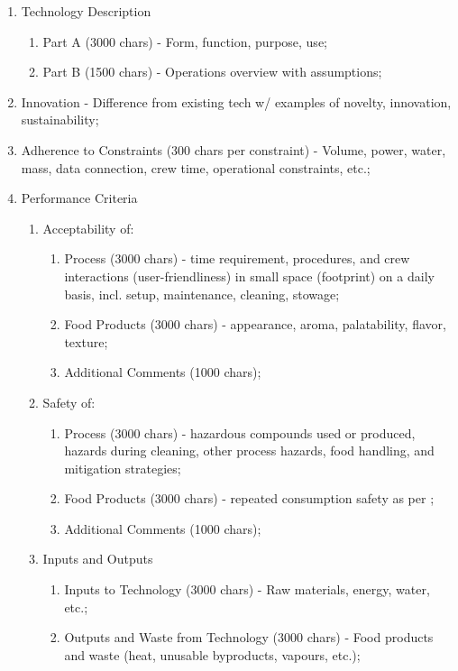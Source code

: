 \documentclass{report}
\begin{document}
\begin{appendices}
\begin{enumerate}
    \item Technology Description
    \begin{enumerate}
        \item Part A (3000 chars) - Form, function, purpose, use;
        \item Part B (1500 chars) - Operations overview with assumptions;
    \end{enumerate}
    \item Innovation - Difference from existing tech w/ examples of novelty, innovation, sustainability;
    \item Adherence to Constraints (300 chars per constraint) - Volume, power, water, mass, data connection, crew time, operational constraints, etc.;
    \item Performance Criteria
    \begin{enumerate}
        \item Acceptability of:
        \begin{enumerate}
            \item Process (3000 chars) - time requirement, procedures, and crew interactions (user-friendliness) in small space (footprint) on a daily basis, incl. setup, maintenance, cleaning, stowage;
            \item Food Products (3000 chars) - appearance, aroma, palatability, flavor, texture;
            \item Additional Comments (1000 chars);
        \end{enumerate}
        \item Safety of:
        \begin{enumerate}
            \item Process (3000 chars) - hazardous compounds used or produced, hazards during cleaning, other process hazards, food handling, and mitigation strategies;
            \item Food Products (3000 chars) - repeated consumption safety as per \cite{nutrition};
            \item Additional Comments (1000 chars);
        \end{enumerate}
        \item Inputs and Outputs
        \begin{enumerate}
            \item Inputs to Technology (3000 chars) - Raw materials, energy, water, etc.;
            \item Outputs and Waste from Technology (3000 chars) - Food products and waste (heat, unusable byproducts, vapours, etc.);

\end{enumerate}
\end{enumerate}
\end{enumerate}
\end{appendices}
\end{document}
